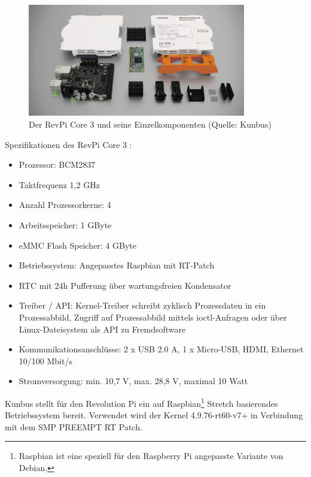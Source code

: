 \begin{figure}[h]
    \centering
    \includegraphics[width=0.85\textwidth]{doc/tex/images/revpi_teardown.png}
    \caption{Der RevPi Core 3 und seine Einzelkomponenten (Quelle: Kunbus)
      \label{fig:revpi-expl}}
\end{figure}

Spezifikationen des RevPi Core 3 \citep[Auswahl, vgl.][S. 1]{datasheet-revpi}:
\begin{itemize}
  \item{Prozessor: BCM2837}
  \item{Taktfrequenz 1,2 GHz}
  \item{Anzahl Prozessorkerne: 4}
  \item{Arbeitsspeicher: 1 GByte}
  \item{eMMC Flash Speicher: 4 GByte}
  \item{Betriebssystem: Angepasstes Raspbian mit RT-Patch}
  \item{RTC mit 24h Pufferung über wartungsfreien Kondensator}
  \item{Treiber / API: Kernel-Treiber schreibt zyklisch Prozessdaten in ein Prozessabbild, Zugriff auf Prozessabbild mittels ioctl-Anfragen oder über Linux-Dateisystem als API zu Fremdsoftware}
  \item{Kommunikationsanschlüsse: 2 x USB 2.0 A, 1 x Micro-USB, HDMI, Ethernet 10/100 Mbit/s}
  \item{Stromversorgung: min. 10,7 V, max. 28,8 V, maximal 10 Watt}
\end{itemize}

Kunbus stellt für den Revolution Pi ein auf Raspbian\footnote{Raspbian ist eine speziell 
für den Raspberry Pi angepasste Variante von Debian.} Stretch basierendes Betriebssystem bereit.
Verwendet wird der Kernel 4.9.76-rt60-v7+ in Verbindung mit dem SMP PREEMPT RT Patch.

